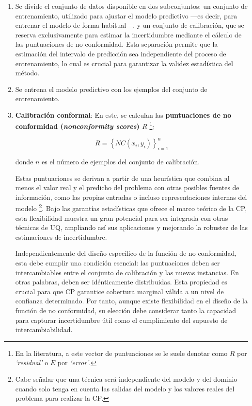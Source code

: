 \begin{enumerate}

    \item Se divide el conjunto de datos disponible en dos subconjuntos: un conjunto de entrenamiento, utilizado para ajustar el modelo predictivo ---es decir, para entrenar el modelo de forma habitual---, y un conjunto de calibración, que se reserva exclusivamente para estimar la incertidumbre mediante el cálculo de las puntuaciones de no conformidad. Esta separación permite que la estimación del intervalo de predicción sea independiente del proceso de entrenamiento, lo cual es crucial para garantizar la validez estadística del método.

    \item Se entrena el modelo predictivo con los ejemplos del conjunto de entrenamiento. 

    \item \textbf{Calibración conformal}: En este, se calculan las \textbf{puntuaciones de no conformidad (\textit{nonconformity scores}) $R$}%
    \footnote{
        En la literatura, a este vector de puntuaciones se le suele denotar como $R$ por \textit{`residual'}
        o $E$ por \textit{`error'}. 
    }:

    $$
    R = \left\{ NC(x_i,y_i) \right\}_{i=1}^n
    $$

    donde $n$ es el número de ejemplos del conjunto de calibración.

    Estas puntuaciones se derivan a partir de una heurística que combina al menos el valor real y el predicho del problema con otras posibles fuentes de información, como las propias entradas o incluso representaciones internas del modelo%
    \footnote{
        Cabe señalar que una técnica será independiente del modelo y del dominio cuando solo tenga en cuenta las salidas del modelo y los valores reales del problema para realizar la \acrshort{CP}.
    }. 
    Bajo las garantías estadísticas que ofrece el marco teórico de la \acrshort{CP}, esta flexibilidad muestra un gran potencial para ser integrada con otras técnicas de \acrshort{UQ}, ampliando así sus aplicaciones y mejorando la robustez de las estimaciones de incertidumbre.

    Independientemente del diseño específico de la función de no conformidad, esta debe cumplir una condición esencial: las puntuaciones deben ser intercambiables entre el conjunto de calibración y las nuevas instancias. En otras palabras, deben ser idénticamente distribuidas. Esta propiedad es crucial para que \acrshort{CP} garantice cobertura marginal válida a un nivel de confianza determinado. Por tanto, aunque existe flexibilidad en el diseño de la función de no conformidad, su elección debe considerar tanto la capacidad para capturar incertidumbre útil como el cumplimiento del supuesto de intercambiabilidad. 


\end{enumerate}
